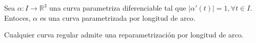 \begin{defn}
  Sea $\alpha: I \to \mathbb{R}^{3}$ una curva parametriza diferenciable tal que $ |\alpha ' (t)| = 1, \forall t \in I$. Entoces, $\alpha$ es una curva parametrizada por longitud de arco.
\end{defn}

\begin{prop}
  Cualquier curva regular admite una reparametrización por longitud de arco.
\end{prop}

